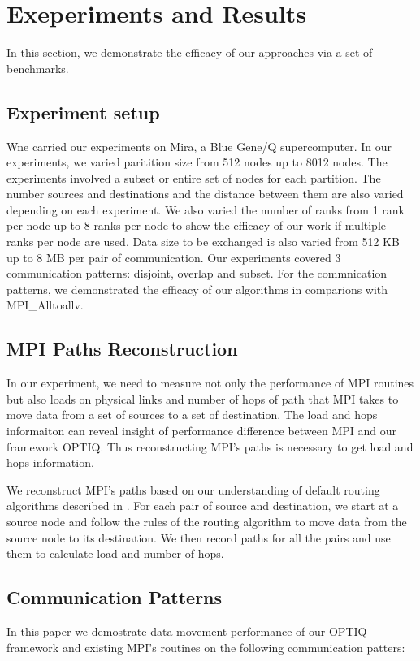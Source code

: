\section{Exeperiments and Results}
\label{sec:benchmark}

In this section, we demonstrate the efficacy of our approaches via a set of benchmarks.

\subsection{Experiment setup}

Wne carried our experiments on Mira, a Blue Gene/Q supercomputer. In our experiments, we varied paritition size from 512 nodes up to 8012 nodes. The experiments involved a subset or entire set of nodes for each partition. The number sources and destinations and the distance between them are also varied depending on each experiment. We also varied the number of ranks from 1 rank per node up to 8 ranks per node to show the efficacy of our work if multiple ranks per node are used. Data size to be exchanged is also varied from 512 KB up to 8 MB per pair of communication. Our experiments covered 3 communication patterns: disjoint, overlap and subset. For the commnication patterns, we demonstrated the efficacy of our algorithms in comparions with MPI\_Alltoallv.

\subsection{MPI Paths Reconstruction}

In our experiment, we need to measure not only the performance of MPI routines but also loads on physical links and number of hops of path that MPI takes to move data from a set of sources to a set of destination. The load and hops informaiton can reveal insight of performance difference between MPI and our framework OPTIQ. Thus reconstructing MPI's paths is necessary to get load and hops information.

We reconstruct MPI's paths based on our understanding of default routing algorithms described in \cite{Chen:BGQ}. For each pair of source and destination, we start at a source node and follow the rules of the routing algorithm to move data from the source node to its destination. We then record paths for all the pairs and use them to calculate load and number of hops. 

\subsection{Communication Patterns}
In this paper we demostrate data movement performance of our OPTIQ framework and existing MPI's routines on the following communication patters:

